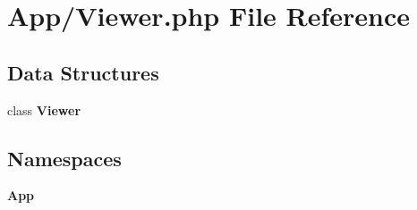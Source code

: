 \section{App/\+Viewer.php File Reference}
\label{_viewer_8php}
\subsection*{Data Structures}
\begin{DoxyCompactItemize}
\item 
class \textbf{ Viewer}
\end{DoxyCompactItemize}
\subsection*{Namespaces}
\begin{DoxyCompactItemize}
\item 
 \textbf{ App}
\end{DoxyCompactItemize}
